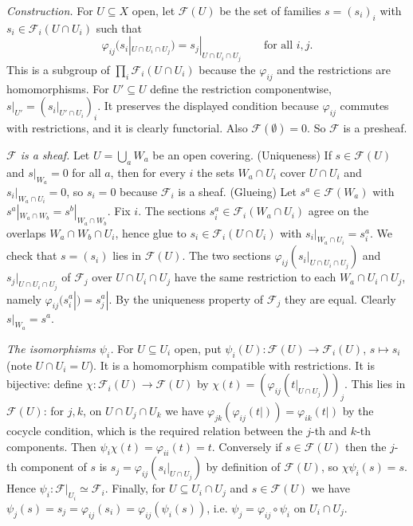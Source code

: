 \documentclass[11pt]{article}
\begin{document}
\emph{Construction.} For $U\subseteq X$ open, let $\mathcal{F}(U)$ be the set of families $s=(s_i)_i$ with $s_i\in\mathcal{F}_i(U\cap U_i)$ such that
\[ \varphi_{ij}\bigl(s_i|_{U\cap U_i\cap U_j}\bigr)=s_j|_{U\cap U_i\cap U_j}\qquad\text{for all } i,j. \]
This is a subgroup of $\prod_i\mathcal{F}_i(U\cap U_i)$ because the $\varphi_{ij}$ and the restrictions are homomorphisms. For $U'\subseteq U$ define the restriction componentwise, $s|_{U'}=(s_i|_{U'\cap U_i})_i$. It preserves the displayed condition because $\varphi_{ij}$ commutes with restrictions, and it is clearly functorial. Also $\mathcal{F}(\emptyset)=0$. So $\mathcal{F}$ is a presheaf.

\emph{$\mathcal{F}$ is a sheaf.} Let $U=\bigcup_a W_a$ be an open covering. (Uniqueness) If $s\in\mathcal{F}(U)$ and $s|_{W_a}=0$ for all $a$, then for every $i$ the sets $W_a\cap U_i$ cover $U\cap U_i$ and $s_i|_{W_a\cap U_i}=0$, so $s_i=0$ because $\mathcal{F}_i$ is a sheaf. (Glueing) Let $s^a\in\mathcal{F}(W_a)$ with $s^a|_{W_a\cap W_b}=s^b|_{W_a\cap W_b}$. Fix $i$. The sections $s^a_i\in\mathcal{F}_i(W_a\cap U_i)$ agree on the overlaps $W_a\cap W_b\cap U_i$, hence glue to $s_i\in\mathcal{F}_i(U\cap U_i)$ with $s_i|_{W_a\cap U_i}=s^a_i$. We check that $s=(s_i)$ lies in $\mathcal{F}(U)$. The two sections $\varphi_{ij}(s_i|_{U\cap U_i\cap U_j})$ and $s_j|_{U\cap U_i\cap U_j}$ of $\mathcal{F}_j$ over $U\cap U_i\cap U_j$ have the same restriction to each $W_a\cap U_i\cap U_j$, namely $\varphi_{ij}(s^a_i|)=s^a_j|$. By the uniqueness property of $\mathcal{F}_j$ they are equal. Clearly $s|_{W_a}=s^a$.

\emph{The isomorphisms $\psi_i$.} For $U\subseteq U_i$ open, put $\psi_i(U):\mathcal{F}(U)\to\mathcal{F}_i(U)$, $s\mapsto s_i$ (note $U\cap U_i=U$). It is a homomorphism compatible with restrictions. It is bijective: define $\chi:\mathcal{F}_i(U)\to\mathcal{F}(U)$ by $\chi(t)=(\varphi_{ij}(t|_{U\cap U_j}))_j$. This lies in $\mathcal{F}(U)$: for $j,k$, on $U\cap U_j\cap U_k$ we have $\varphi_{jk}(\varphi_{ij}(t|))=\varphi_{ik}(t|)$ by the cocycle condition, which is the required relation between the $j$-th and $k$-th components. Then $\psi_i\chi(t)=\varphi_{ii}(t)=t$. Conversely if $s\in\mathcal{F}(U)$ then the $j$-th component of $s$ is $s_j=\varphi_{ij}(s_i|_{U\cap U_j})$ by definition of $\mathcal{F}(U)$, so $\chi\psi_i(s)=s$. Hence $\psi_i:\mathcal{F}|_{U_i}\simeq\mathcal{F}_i$. Finally, for $U\subseteq U_i\cap U_j$ and $s\in\mathcal{F}(U)$ we have $\psi_j(s)=s_j=\varphi_{ij}(s_i)=\varphi_{ij}(\psi_i(s))$, i.e. $\psi_j=\varphi_{ij}\circ\psi_i$ on $U_i\cap U_j$.
\end{document}
